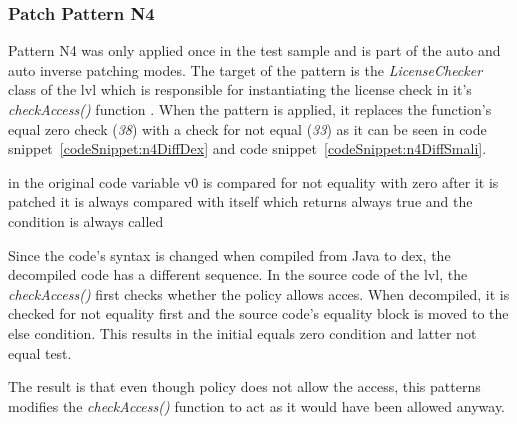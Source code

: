 \subsubsection{Patch Pattern N4}
Pattern N4 was only applied once in the test sample and is part of the auto and auto inverse patching modes.
The target of the pattern is the \textit{LicenseChecker} class of the \gls{lvl} which is responsible for instantiating the license check in it's \textit{checkAccess()} function \cite{developersLicensingReference}.
\newline
When the pattern is applied, it replaces the function's equal zero check (\textit{38}) with a check for not equal (\textit{33}) as it can be seen in code snippet~\ref{codeSnippet:n4DiffDex} and code snippet~\ref{codeSnippet:n4DiffSmali}.
\newline



in the original code variable v0 is compared for not equality with zero
after it is patched it is always compared with itself which returns always true and the condition is always called

Since the code's syntax is changed when compiled from Java to dex, the decompiled code has a different sequence.
In the source code of the \gls{lvl}, the \textit{checkAccess()} first checks whether the policy allows acces.
When decompiled, it is checked for not equality first and the source code's equality block is moved to the else condition.
This results in the initial equals zero condition and latter not equal test.



The result is that even though policy does not allow the access, this patterns modifies the \textit{checkAccess()} function to act as it would have been allowed anyway.


